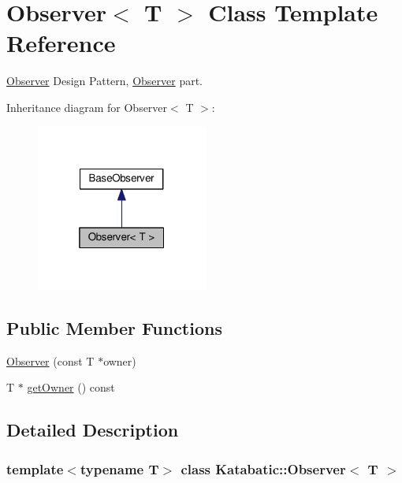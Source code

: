 \hypertarget{classKatabatic_1_1Observer}{}\section{Observer$<$ T $>$ Class Template Reference}
\label{classKatabatic_1_1Observer}


\hyperlink{classKatabatic_1_1Observer}{Observer} Design Pattern, \hyperlink{classKatabatic_1_1Observer}{Observer} part.  




Inheritance diagram for Observer$<$ T $>$\+:\nopagebreak
\begin{figure}[H]
\begin{center}
\leavevmode
\includegraphics[width=160pt]{classKatabatic_1_1Observer__inherit__graph}
\end{center}
\end{figure}
\subsection*{Public Member Functions}
\begin{DoxyCompactItemize}
\item 
\hyperlink{classKatabatic_1_1Observer_ab05ec12517c51952960dd4f324499b44}{Observer} (const T $\ast$owner)
\item 
T $\ast$ \hyperlink{classKatabatic_1_1Observer_ac29b8f99d632058c95784fd7233b8474}{get\+Owner} () const
\end{DoxyCompactItemize}


\subsection{Detailed Description}
\subsubsection*{template$<$typename T$>$\newline
class Katabatic\+::\+Observer$<$ T $>$}

